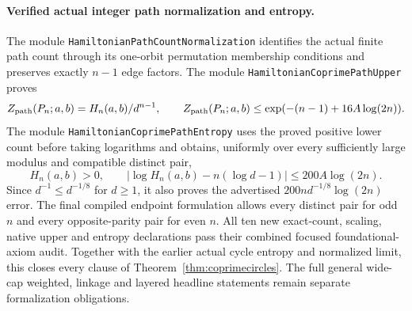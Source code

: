 \paragraph{Verified actual integer path normalization and entropy.}
The module \texttt{HamiltonianPathCountNormalization} identifies
the actual finite path count through its one-orbit permutation
membership conditions and preserves exactly \(n-1\) edge factors.
The module \texttt{HamiltonianCoprimePathUpper} proves
\[
 Z_{\rm path}(P_n;a,b)=H_n(a,b)/d^{n-1},
 \qquad
 Z_{\rm path}(P_n;a,b)
      \leq\exp(-(n-1)+16A\log(2n)).
\]
The module \texttt{HamiltonianCoprimePathEntropy} uses the proved
positive lower count before taking logarithms and obtains, uniformly
over every sufficiently large modulus and compatible distinct pair,
\[
 H_n(a,b)>0,\qquad
 \left|\log H_n(a,b)-n(\log d-1)\right|
                       \leq200A\log(2n).
\]
Since \(d^{-1}\leq d^{-1/8}\) for \(d\geq1\), it also proves the
advertised \(200nd^{-1/8}\log(2n)\) error.
The final compiled endpoint formulation allows every distinct pair
for odd \(n\) and every opposite-parity pair for even \(n\).
All ten new exact-count, scaling, native upper and entropy declarations
pass their combined focused foundational-axiom audit.
Together with the earlier actual cycle entropy and normalized limit,
this closes every clause of Theorem~\ref{thm:coprimecircles}.
The full general wide-cap weighted, linkage and layered headline
statements remain separate formalization obligations.

